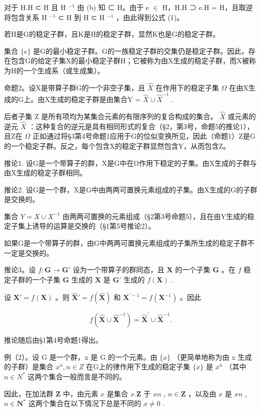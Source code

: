对于 H.H ⊂ H 且 H \(^{-1}\) 由 (b) 知 ⊂ H。由于 e \ensuremath{\in} H，H.H ⊃ e.H = H，且取逆将包含关系 H \(^{-1}\) ⊂ H 到 H ⊂ H \(^{-1}\) ，由此得到公式 (1)。

若H是G的稳定子群，且K是H的稳定子群，显然K也是G的稳定子群。

集合 \(\{e\}\) 是G的最小稳定子群。G的一族稳定子群的交集仍是稳定子群。因此，存在包含G的给定子集X的最小稳定子群H；它被称为由X生成的稳定子群，而X被称为H的一个生成系（或生成集）。

命题2。设X是带算子群G的一个非空子集，且 \(\hat{X}\) 在作用下的稳定子集 \(\Omega\) 在由X生成的G上。由X生成的稳定子群是由集合Y = \(\hat{X} \cup \hat{X}^{-1}\) .

后者子集 Z 是所有项均为某集合元素的有限序列的复合构成的集合。 \(\hat{X}\) 或元素的逆元 \(\hat{X}\) ：这种复合的逆元是具有相同形式的复合（§2，第3号，命题5的推论1），且Z在 \(\Omega\) 正如通过将§3第4号命题1应用于G的位似变换所见，因此（命题1）Z是G的一个稳定子群。反之，每个包含X的稳定子群显然包含Y，从而包含Z。

推论1. 设G是一个带算子的群，X是G中在Ω作用下稳定的子集。由X生成的子群与由X生成的稳定子群相同。

推论2. 设G是一个群，X是G中由两两可置换元素组成的子集。由X生成的G的子群是交换的。

集合 \(Y = X \cup X^{-1}\) 由两两可置换的元素组成（§2第3号命题5），且在由Y生成的稳定子集上诱导的运算是交换的（§1第5号推论2）。

如果G是一个带算子的群，由G中两两可置换元素组成的子集所生成的稳定子群不一定是交换的。

推论3。设 \(f: \mathbf{G} \to \mathbf{G}'\) 设为一个带算子的群同态，且 \(\mathbf{X}\) 的一个子集 \(\mathbf{G}\) 。在 \(f\) 稳定子群的一个子集 \(\mathbf{G}\) 生成的 \(\mathbf{X}\) 是 \(\mathbf{G}'\) 生成的 \(f(\mathbf{X})\) .

设 \(\mathbf{X}' = f(\mathbf{X})\) 。则 \(\hat{\mathbf{X}}' = f(\hat{\mathbf{X}})\) 和 \(\mathbf{X}^{\prime -1} = f(\mathbf{X}^{-1})\) 。因此

\[
f (\hat {\mathbf {X}} \cup \hat {\mathbf {X}} ^ {- 1}) = \hat {\mathbf {X}} ^ {\prime} \cup \hat {\mathbf {X}} ^ {- 1}.
\]

推论随后由§1第4号命题1得出。

例（2）。设 G 是一个群，x 是 G 的一个元素。由 \(\{x\}\) （更简单地称为由 x 生成的子群）是集合 \(x^{n}, n \in Z\) 在G上的律作用下生成的稳定子集 \(\{x\}\) 是 \(x^{n}\) （其中 \(n \in N^{*}\) 这两个集合一般而言是不同的。

因此，在加法群 \(\mathbf{Z}\) 中，由元素 \(x\) 是集合 \(x.\mathbf{Z}\) 于 \(xn\) , \(n \in \mathbf{Z}\) ，以及由 \(x\) 是 \(xn\) , \(n \in \mathbf{N}^*\) 这两个集合在以下情况下总是不同的 \(x \neq 0\) .

